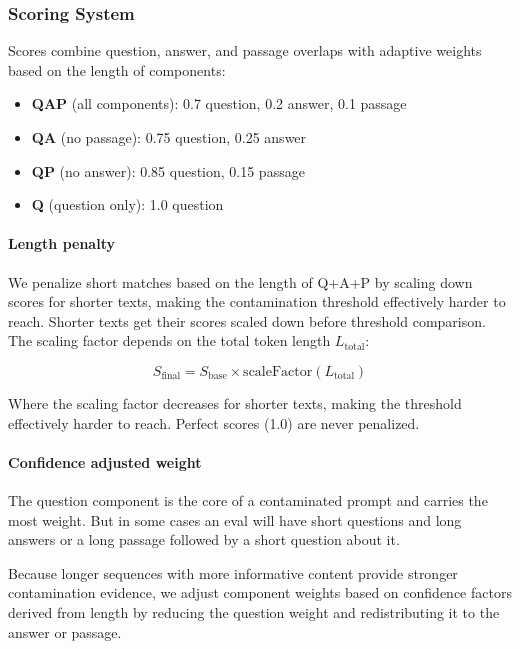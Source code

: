 \documentclass[table]{ai2style/ai2}
\begin{document}
{{\subsubsection{Scoring System}

Scores combine question, answer, and passage overlaps with adaptive weights based on the length of components:

\begin{itemize}
    \item {\bf{QAP}} (all components): 0.7 question, 0.2 answer, 0.1 passage
    \item {\bf{QA}} (no passage): 0.75 question, 0.25 answer
    \item {\bf{QP}} (no answer): 0.85 question, 0.15 passage
    \item {\bf{Q}} (question only): 1.0 question
\end{itemize}

\paragraph{Length penalty} We penalize short matches based on the length of Q+A+P by scaling down scores for shorter texts, making the contamination threshold effectively harder to reach. Shorter texts get their scores scaled down before threshold comparison. The scaling factor depends on the total token length $L_\text{total}$:

\begin{equation*}
S_\text{final} = S_\text{base} \times \text{scaleFactor}(L_\text{total})
\end{equation*}

Where the scaling factor decreases for shorter texts, making the threshold effectively harder to reach. Perfect scores (1.0) are never penalized.

\paragraph{Confidence adjusted weight} The question component is the core of a contaminated prompt and carries the most weight. But in some cases an eval will have short questions and long answers or a long passage followed by a short question about it.

Because longer sequences with more informative content provide stronger contamination evidence, we adjust component weights based on confidence factors derived from length by reducing the question weight and redistributing it to the answer or passage.

}}
\end{document}
